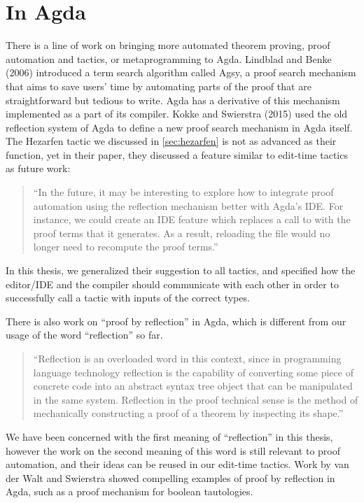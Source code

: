 \section{In Agda}

There is a line of work on bringing more automated theorem proving,
proof automation and tactics, or metaprogramming to Agda.
Lindblad and Benke (2006) introduced a term search algorithm called
Agsy, a proof search mechanism that aims to save users' time by automating
parts of the proof that are straightforward but tedious to write.\cite{agsy}
Agda has a derivative of this mechanism implemented as a part of its compiler.
Kokke and Swierstra (2015) used the old reflection system of Agda to define a
new proof search mechanism in Agda itself.\cite{autoinagda}
The Hezarfen tactic we discussed in \autoref{sec:hezarfen} is not as advanced
as their  function, yet in their paper, they discussed a feature
similar to edit-time tactics as future work:

\begin{quote}
  ``In the future, it may be interesting to explore how to integrate proof
  automation using the reflection mechanism better with Agda's IDE. For
  instance, we could create an IDE feature which replaces a call to
   with the proof terms that it generates. As a result, reloading
  the file would no longer need to recompute the proof terms.''\cite{autoinagda}
\end{quote}

In this thesis, we generalized their suggestion to all tactics, and specified
how the editor/IDE and the compiler should communicate with each other
in order to successfully call a tactic with inputs of the correct types.

There is also work on ``proof by reflection'' in Agda, which is different from our
usage of the word ``reflection'' so far.

\begin{quote}\label{quote:reflection}
``Reflection is an overloaded word in this context, since in programming language
  technology reflection is the capability of converting some piece of concrete
  code into an abstract syntax tree object that can be manipulated in the same
  system. Reflection in the proof technical sense is the method of mechanically
  constructing a proof of a theorem by inspecting its shape.''\cite{reflInAgda}
\end{quote}

We have been concerned with the first meaning of ``reflection'' in this thesis,
however the work on the second meaning of this word is still relevant to proof
automation, and their ideas can be reused in our edit-time tactics. Work by van
der Walt and Swierstra showed compelling examples of proof by reflection in
Agda, such as a proof mechanism for boolean tautologies.\cite{pfByReflAgda}

